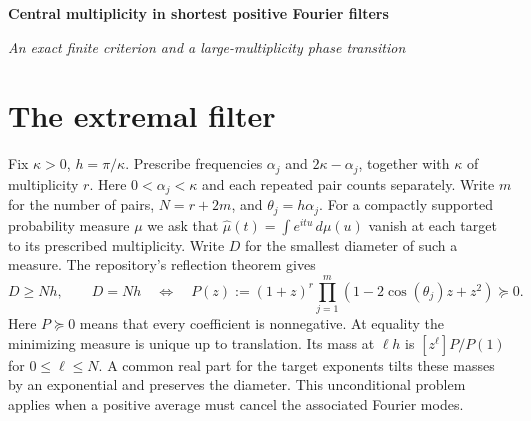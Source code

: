 \documentclass[11pt]{article}
\newcommand{\coef}{\succeq 0}
\begin{document}
\begin{center}
{\LARGE\bfseries Central multiplicity in shortest positive Fourier filters\par}
\smallskip
{\itshape An exact finite criterion and a large-multiplicity phase transition}
\end{center}
\begin{abstract}
For frequencies paired about a central frequency, a positive annihilating measure attains a prescribed lower bound on its support diameter precisely when an associated polynomial has nonnegative coefficients. We determine how much central multiplicity suffices. In the angular band $\pi/3\le\theta_j\le\pi/2$ the exact criterion for arbitrary pairs is $r\ge 2\sum_j\cos\theta_j$, with repetitions allowed. For a single pair of order $m$ at any angle $0<\theta<\pi/3$, the least central multiplicity is $\tau(\cos\theta)m+o(m)$, with $\tau$ determined by a scalar equation. These results give the sharp large-power asymptotic of the Lorentz degree of the centered quadratic $X^2+\varepsilon^2$.
\end{abstract}

\section{The extremal filter}

Fix $\kappa>0$, $h=\pi/\kappa$. Prescribe frequencies $\alpha_j$ and $2\kappa-\alpha_j$, together with $\kappa$ of multiplicity $r$. Here $0<\alpha_j<\kappa$ and each repeated pair counts separately. Write $m$ for the number of pairs, $N=r+2m$, and $\theta_j=h\alpha_j$. For a compactly supported probability measure $\mu$ we ask that
$\widehat\mu(t)=\int e^{itu}\,d\mu(u)$ vanish at each target to its prescribed multiplicity. Write $D$ for the smallest diameter of such a measure. The repository's reflection theorem \cite{repo} gives
\begin{equation}\label{reflection}
 D\ge Nh,\qquad D=Nh\quad\Longleftrightarrow\quad
 P(z):=(1+z)^r\prod_{j=1}^m(1-2\cos(\theta_j)z+z^2)\coef .
\end{equation}
Here $P\coef$ means that every coefficient is nonnegative. At equality the minimizing measure is unique up to translation. Its mass at $\ell h$ is $[z^\ell]P/P(1)$ for $0\le\ell\le N$. A common real part for the target exponents tilts these masses by an exponential and preserves the diameter. This unconditional problem applies when a positive average must cancel the associated Fourier modes.
\end{document}
